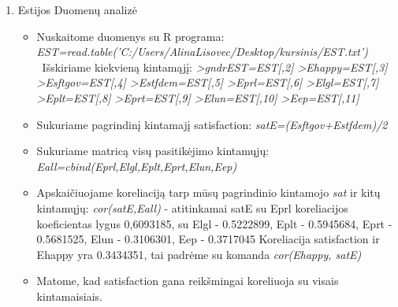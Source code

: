 \documentclass[a4paper]{article}
\begin{document}
\begin{enumerate}
\begin{itemize}



\end{itemize}

\item Estijos Duomenų analizė

\begin{itemize}
\item Nuskaitome duomenys su R programa: 
\newline
\textit {EST=read.table('C:/Users/AlinaLisovec/Desktop/kursinis/EST.txt')}
\ Išskiriame kiekvieną kintamąjį:
\newline
\textit {>gndrEST=EST[,2] 
\newline >Ehappy=EST[,3] 
\newline >Esftgov=EST[,4]
\newline >Estfdem=EST[,5]
\newline >Eprl=EST[,6]
\newline >Elgl=EST[,7]
\newline >Eplt=EST[,8]
\newline >Eprt=EST[,9]
\newline >Elun=EST[,10]
\newline >Eep=EST[,11]}

\item Sukuriame pagrindinį kintamajį satisfaction:
\newline 
\textit{satE=(Esftgov+Estfdem)/2}
\item Sukuriame matricą visų pasitikėjimo kintamųjų:
\newline \textit {Eall=cbind(Eprl,Elgl,Eplt,Eprt,Elun,Eep)}
\item Apskaičiuojame koreliaciją tarp mūsų pagrindinio kintamojo \textit{sat} ir kitų kintamųjų:
\newline  \textit{cor(satE,Eall)}  -  atitinkamai satE su Eprl koreliacijos koeficientas lygus 0,6093185,  su  Elgl -  0.5222899,  Eplt - 0.5945684, Eprt - 0.5681525, Elun - 0.3106301, Eep - 0.3717045
\newline Koreliacija satisfaction ir  Ehappy yra 0.3434351, tai padrėme su komanda 
\newline \textit{cor(Ehappy, satE)}
\item Matome, kad satisfaction gana reikšmingai koreliuoja su visais kintamaisiais.


\end{itemize}
\end{enumerate}
\end{document}
